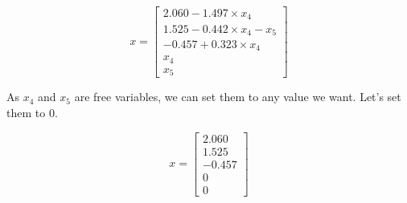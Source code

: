 \[
    x = \begin{bmatrix}
        2.060 - 1.497 \times x_4 \\
        1.525 - 0.442 \times x_4 - x_5 \\
        -0.457 + 0.323 \times x_4 \\
        x_4 \\
        x_5
    \end{bmatrix}
\]

As $x_4$ and $x_5$ are free variables, we can set them to any value we want. Let's set them to 0.

\[
    x = \begin{bmatrix}
        2.060 \\
        1.525 \\
        -0.457 \\
        0 \\
        0
    \end{bmatrix}
\]
